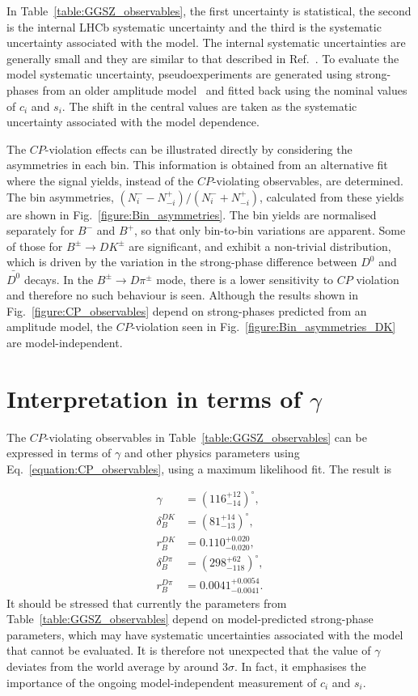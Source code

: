 \documentclass[12pt, a4paper, notitlepage, onecolumn]{article}
\begin{document}
In Table~\ref{table:GGSZ_observables}, the first uncertainty is statistical, the second is the internal LHCb systematic uncertainty and the third is the systematic uncertainty associated with the model. The internal systematic uncertainties are generally small and they are similar to that described in Ref.~\cite{LHCb-PAPER-2020-019}. To evaluate the model systematic uncertainty, pseudoexperiments are generated using strong-phases from an older amplitude model~\cite{CLEO_KKpipi_cisi} and fitted back using the nominal values of $c_i$ and $s_i$. The shift in the central values are taken as the systematic uncertainty associated with the model dependence.

The $C\!P$-violation effects can be illustrated directly by considering the asymmetries in each bin. This information is obtained from an alternative fit where the signal yields, instead of the $C\!P$-violating observables, are determined. The bin asymmetries, $(N_i^- - N_{-i}^+)/(N_i^- + N_{-i}^+)$, calculated from these yields are shown in Fig.~\ref{figure:Bin_asymmetries}. The bin yields are normalised separately for $B^-$ and $B^+$, so that only bin-to-bin variations are apparent. Some of those for $B^\pm\to DK^\pm$ are significant, and exhibit a non-trivial distribution, which is driven by the variation in the strong-phase difference between $D^0$ and $\bar{D^0}$ decays. In the $B^\pm\to D\pi^\pm$ mode, there is a lower sensitivity to $C\!P$ violation and therefore no such behaviour is seen. Although the results shown in Fig.~\ref{figure:CP_observables} depend on strong-phases predicted from an amplitude model, the $C\!P$-violation seen in Fig.~\ref{figure:Bin_asymmetries_DK} are model-independent.

\section{Interpretation in terms of \texorpdfstring{$\gamma$}{gamma}}
\noindent The $C\!P$-violating observables in Table~\ref{table:GGSZ_observables} can be expressed in terms of $\gamma$ and other physics parameters using Eq.~\eqref{equation:CP_observables}, using a maximum likelihood fit. The result is

\begin{align*}
    \gamma &= (116^{+12}_{-14})^\circ, \\
    \delta_B^{DK} &= (81^{+14}_{-13})^\circ, \\
    r_B^{DK} &= 0.110^{+0.020}_{-0.020}, \\
    \delta_B^{D\pi} &= (298^{+62}_{-118})^\circ, \\
    r_B^{D\pi} &= 0.0041^{+0.0054}_{-0.0041}.
\end{align*}
It should be stressed that currently the parameters from Table~\ref{table:GGSZ_observables} depend on model-predicted strong-phase parameters, which may have systematic uncertainties associated with the model that cannot be evaluated. It is therefore not unexpected that the value of $\gamma$ deviates from the world average by around $3\sigma$. In fact, it emphasises the importance of the ongoing model-independent measurement of $c_i$ and $s_i$.
\end{document}
